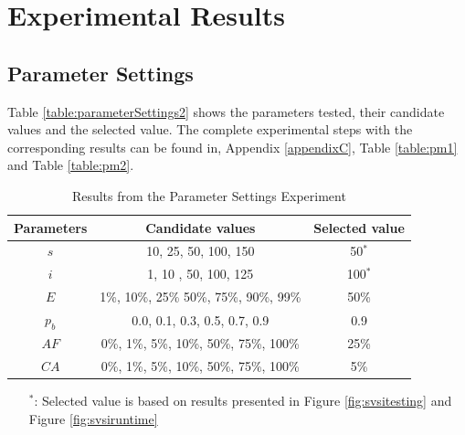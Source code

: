 \section{Experimental Results}
\label{sec:expResults}

\subsection{Parameter Settings}
\label{subsec:parameterSettings_results}

Table \vref{table:parameterSettings2} shows the parameters tested, their candidate values and the selected value. The complete experimental steps with the corresponding results can be found in, Appendix \ref{appendixC}, Table \vref{table:pm1} and Table \vref{table:pm2}. 

    \begin{table}[H]
    \centering
    \begin{tabular}{|c|c||c|}
    \hline
    Parameters & Candidate values & Selected value\\
    \hline
    $s$ & 10, 25, 50, 100, 150 & 50$^*$ \\
    $i$ & 1, 10 , 50, 100, 125 & 100$^*$ \\
    $E$ & 1\%, 10\%, 25\% 50\%, 75\%, 90\%, 99\% & 50\% \\
    $p_{b}$ & 0.0, 0.1, 0.3, 0.5, 0.7, 0.9 & 0.9 \\
    $AF$ & 0\%, 1\%, 5\%, 10\%, 50\%, 75\%, 100\% & 25\% \\
    $CA$ & 0\%, 1\%, 5\%, 10\%, 50\%, 75\%, 100\% & 5\% \\
    \hline
    \end{tabular}
    \caption {Results from the Parameter Settings Experiment}
    \begin{itemize}[noitemsep]
    \item[$^*$:]  Selected value is based on results presented in Figure \vref{fig:svsitesting} and Figure \vref{fig:svsiruntime} 
    \end{itemize}
    \label{table:parameterSettings2}
    \end{table}
    


